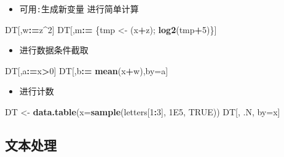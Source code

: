 \documentclass[]{book}
\newenvironment{Shaded}{\begin{snugshade}}{\end{snugshade}}
\newcommand{\DataTypeTok}[1]{\textcolor[rgb]{0.13,0.29,0.53}{#1}}
\newcommand{\DecValTok}[1]{\textcolor[rgb]{0.00,0.00,0.81}{#1}}
\newcommand{\ErrorTok}[1]{\textcolor[rgb]{0.64,0.00,0.00}{\textbf{#1}}}
\newcommand{\FloatTok}[1]{\textcolor[rgb]{0.00,0.00,0.81}{#1}}
\newcommand{\KeywordTok}[1]{\textcolor[rgb]{0.13,0.29,0.53}{\textbf{#1}}}
\newcommand{\NormalTok}[1]{#1}
\newcommand{\OperatorTok}[1]{\textcolor[rgb]{0.81,0.36,0.00}{\textbf{#1}}}
\newcommand{\OtherTok}[1]{\textcolor[rgb]{0.56,0.35,0.01}{#1}}
\newcommand{\StringTok}[1]{\textcolor[rgb]{0.31,0.60,0.02}{#1}}
\providecommand{\tightlist}{%
  \setlength{\itemsep}{0pt}\setlength{\parskip}{0pt}}
\begin{document}
\begin{itemize}
\tightlist
\item
  可用\texttt{:}生成新变量 进行简单计算
\end{itemize}

\begin{Shaded}
\begin{Highlighting}[]
\NormalTok{DT[,w}\OperatorTok{:}\ErrorTok{=}\NormalTok{z}\OperatorTok{^}\DecValTok{2}\NormalTok{]}
\NormalTok{DT[,m}\OperatorTok{:}\ErrorTok{=}\StringTok{ }\NormalTok{\{tmp <-}\StringTok{ }\NormalTok{(x}\OperatorTok{+}\NormalTok{z); }\KeywordTok{log2}\NormalTok{(tmp}\OperatorTok{+}\DecValTok{5}\NormalTok{)\}]}
\end{Highlighting}
\end{Shaded}

\begin{itemize}
\tightlist
\item
  进行数据条件截取
\end{itemize}

\begin{Shaded}
\begin{Highlighting}[]
\NormalTok{DT[,a}\OperatorTok{:}\ErrorTok{=}\NormalTok{x}\OperatorTok{>}\DecValTok{0}\NormalTok{]}
\NormalTok{DT[,b}\OperatorTok{:}\ErrorTok{=}\StringTok{ }\KeywordTok{mean}\NormalTok{(x}\OperatorTok{+}\NormalTok{w),by=a]}
\end{Highlighting}
\end{Shaded}

\begin{itemize}
\tightlist
\item
  进行计数
\end{itemize}

\begin{Shaded}
\begin{Highlighting}[]
\NormalTok{DT <-}\StringTok{ }\KeywordTok{data.table}\NormalTok{(}\DataTypeTok{x=}\KeywordTok{sample}\NormalTok{(letters[}\DecValTok{1}\OperatorTok{:}\DecValTok{3}\NormalTok{], }\FloatTok{1E5}\NormalTok{, }\OtherTok{TRUE}\NormalTok{))}
\NormalTok{DT[, .N, by=x]}
\end{Highlighting}
\end{Shaded}

\hypertarget{ux6587ux672cux5904ux7406}{%
\subsection{文本处理}\label{ux6587ux672cux5904ux7406}}
\end{document}
